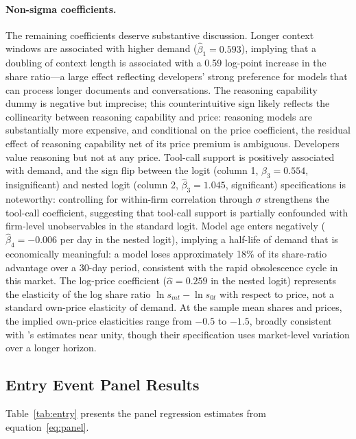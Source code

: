 \documentclass[11pt, a4paper]{article}
\begin{document}
\paragraph{Non-sigma coefficients.} The remaining coefficients deserve substantive discussion. Longer context windows are associated with higher demand ($\hat{\beta}_1 = 0.593$), implying that a doubling of context length is associated with a 0.59 log-point increase in the share ratio---a large effect reflecting developers' strong preference for models that can process longer documents and conversations. The reasoning capability dummy is negative but imprecise; this counterintuitive sign likely reflects the collinearity between reasoning capability and price: reasoning models are substantially more expensive, and conditional on the price coefficient, the residual effect of reasoning capability net of its price premium is ambiguous. Developers value reasoning but not at any price. Tool-call support is positively associated with demand, and the sign flip between the logit (column 1, $\hat{\beta}_3 = 0.554$, insignificant) and nested logit (column 2, $\hat{\beta}_3 = 1.045$, significant) specifications is noteworthy: controlling for within-firm correlation through $\sigma$ strengthens the tool-call coefficient, suggesting that tool-call support is partially confounded with firm-level unobservables in the standard logit. Model age enters negatively ($\hat{\beta}_4 = -0.006$ per day in the nested logit), implying a half-life of demand that is economically meaningful: a model loses approximately 18\% of its share-ratio advantage over a 30-day period, consistent with the rapid obsolescence cycle in this market. The log-price coefficient ($\hat{\alpha} = 0.259$ in the nested logit) represents the elasticity of the log share ratio $\ln s_{mt} - \ln s_{0t}$ with respect to price, not a standard own-price elasticity of demand. At the sample mean shares and prices, the implied own-price elasticities range from $-0.5$ to $-1.5$, broadly consistent with \citet{demirer2025emerging}'s estimates near unity, though their specification uses market-level variation over a longer horizon.

\subsection{Entry Event Panel Results}

Table~\ref{tab:entry} presents the panel regression estimates from equation~\eqref{eq:panel}.
\end{document}
